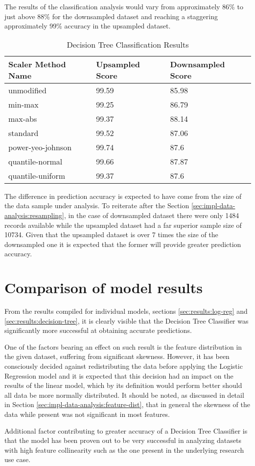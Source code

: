 The results of the classification analysis would vary from approximately 86\% to just above 88\% for the downsampled dataset and reaching a staggering approximately 99\% accuracy in the upsampled dataset.
\begin{table}[h!]
\centering
\caption{Decision Tree Classification Results}
\label{tbl:results:decision-tree}
\begin{tabular}{@{}lll@{}}
\toprule
Scaler Method Name & Upsampled Score & Downsampled Score \\ \midrule
unmodified & 99.59 & 85.98 \\
min-max & 99.25 & 86.79 \\
max-abs & 99.37 & 88.14 \\
standard & 99.52 & 87.06 \\
power-yeo-johnson & 99.74 & 87.6 \\
quantile-normal & 99.66 & 87.87 \\
quantile-uniform & 99.37 & 87.6 \\ \bottomrule
\end{tabular}
\end{table}

The difference in prediction accuracy is expected to have come from the size of the data sample under analysis. To reiterate after the Section \ref{sec:impl-data-analysis:resampling}, in the case of downsampled dataset there were only 1484 records available while the upsampled dataset had a far superior sample size of 10734. Given that the upsampled dataset is over 7 times the size of the downsampled one it is expected that the former will provide greater prediction accuracy.

\section{Comparison of model results}
From the results compiled for individual models, sections \ref{sec:results:log-reg} and \ref{sec:results:decision-tree}, it is clearly visible that the Decision Tree Classifier was significantly more successful at obtaining accurate predictions. 

One of the factors bearing an effect on such result is the feature distribution in the given dataset, suffering from significant skewness. However, it has been consciously decided against redistributing the data before applying the Logistic Regression model and it is expected that this decision had an impact on the results of the linear model, which by its definition would perform better should all data be more normally distributed. It should be noted, as discussed in detail in Section \ref{sec:impl-data-analysis:feature-dist}, that in general the skewness of the data while present was not significant in most features.

Additional factor contributing to greater accuracy of a Decision Tree Classifier is that the model has been proven out to be very successful in analyzing datasets with high feature collinearity \cite{Bertsimas2017Cart} such as the one present in the underlying research use case. 